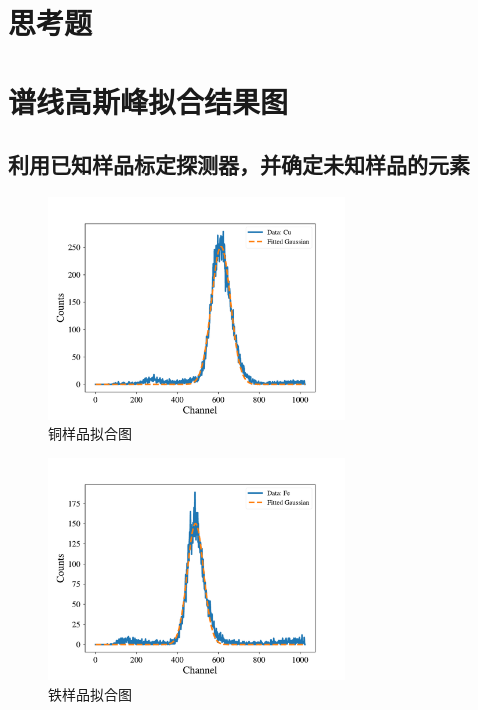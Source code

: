 \documentclass{article}
\begin{document}
    \section{思考题}
    \section{谱线高斯峰拟合结果图}
    \subsection{利用已知样品标定探测器，并确定未知样品的元素}
    \begin{figure}[htbp]
        \centering
        \includegraphics[width=0.7\textwidth]{../plot/Fitted_Cu.pdf}
        \caption{铜样品拟合图\label{fig:Fitted_Cu}}
    \end{figure}
    \begin{figure}[htbp]
        \centering
        \includegraphics[width=0.7\textwidth]{../plot/Fitted_Fe.pdf}
        \caption{铁样品拟合图\label{fig:Fitted_Fe}}
    \end{figure}
\end{document}
